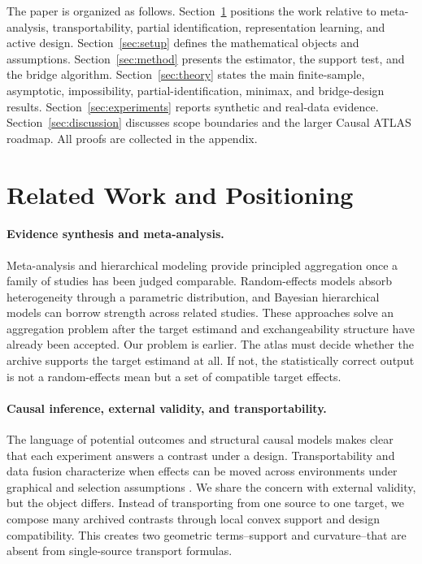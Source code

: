 \documentclass[11pt]{article}
\numberwithin{equation}{section}
\newcommand{\1}{\mathbf 1}
\begin{document}
The paper is organized as follows.  Section~\ref{sec:related} positions the work relative to meta-analysis, transportability, partial identification, representation learning, and active design.  Section~\ref{sec:setup} defines the mathematical objects and assumptions.  Section~\ref{sec:method} presents the estimator, the support test, and the bridge algorithm.  Section~\ref{sec:theory} states the main finite-sample, asymptotic, impossibility, partial-identification, minimax, and bridge-design results.  Section~\ref{sec:experiments} reports synthetic and real-data evidence.  Section~\ref{sec:discussion} discusses scope boundaries and the larger Causal ATLAS roadmap.  All proofs are collected in the appendix.

\section{Related Work and Positioning}
\label{sec:related}

\paragraph{Evidence synthesis and meta-analysis.}
Meta-analysis and hierarchical modeling provide principled aggregation once a family of studies has been judged comparable.  Random-effects models absorb heterogeneity through a parametric distribution, and Bayesian hierarchical models can borrow strength across related studies.  These approaches solve an aggregation problem after the target estimand and exchangeability structure have already been accepted.  Our problem is earlier.  The atlas must decide whether the archive supports the target estimand at all.  If not, the statistically correct output is not a random-effects mean but a set of compatible target effects.

\paragraph{Causal inference, external validity, and transportability.}
The language of potential outcomes \citep{neyman1923,rubin1974estimating,imbens2015causal} and structural causal models \citep{pearl2009causality} makes clear that each experiment answers a contrast under a design.  Transportability and data fusion characterize when effects can be moved across environments under graphical and selection assumptions \citep{bareinboim2016causal}.  We share the concern with external validity, but the object differs.  Instead of transporting from one source to one target, we compose many archived contrasts through local convex support and design compatibility.  This creates two geometric terms--support and curvature--that are absent from single-source transport formulas.
\end{document}

